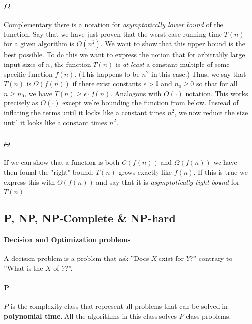 \documentclass[12pt]{article} %
\begin{document}
\subsubsection{$\Omega$}
Complementary there is a notation for \textit{asymptotically lower bound} of the function. Say that we have just proven that the worst-case running time $T(n)$ for a given algorithm is $O(n^2)$. We want to show that this upper bound is the best possible. To do this we want to express the notion that for arbitralily large input sizes of $n$, the function $T(n)$ is \textit{at least} a constant multiple of some specific function $f(n)$. (This happens to be $n^2$ in this case.) Thus, we say that $T(n)$ is $\Omega(f(n))$ if there exist constants $\epsilon > 0$ and $n_0 \geq 0$ so that for all $n \geq n_0$, we have $T(n) \geq \epsilon \cdot f(n)$. Analogous with $O(\cdot)$ notation. This works precisely as $O(\cdot)$ except we're bounding the function from below. Instead of inflating the terms until it looks like a constant times $n^2$, we now reduce the size until it looks like a constant times $n^2$.  

\subsubsection{$\Theta$}

If we can show that a function is both $O(f(n))$ and $\Omega(f(n))$ we have then found the "right" bound: $T(n)$ grows exactly like $f(n)$. If this is true we express this with $\Theta(f(n))$ and say that it is \textit{asymptotically tight bound} for $T(n)$

\subsection{P, NP, NP-Complete \& NP-hard}

\paragraph{Decision and Optimization problems}
A decision problem is a problem that ask ''Does $X$ exist for $Y$?'' contrary to ''What is the $X$ of $Y$?''.

\paragraph{P}
$P$ is the complexity class that represent all problems that can be solved in \textbf{polynomial time}. All the algorithms in this class solves $P$ class problems.
\end{document}
